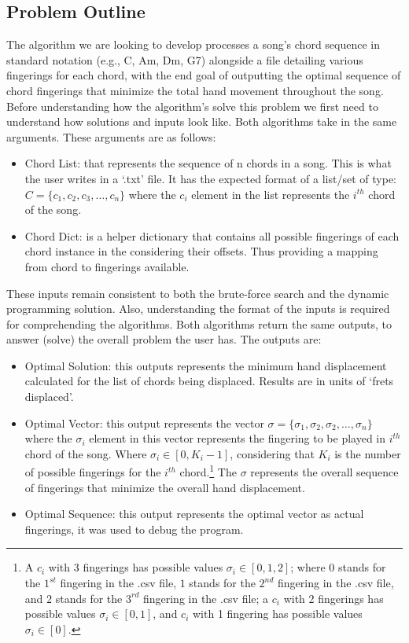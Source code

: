 \documentclass[conference]{IEEEtran}
\begin{document}
\subsection{Problem Outline}
The algorithm we are looking to develop processes a song's chord sequence in standard notation (e.g., C, Am, Dm, G7) alongside a file detailing various fingerings for each chord, with the end goal of outputting the optimal sequence of chord fingerings that minimize the total hand movement throughout the song. Before understanding how the algorithm's solve this problem we first need to understand how solutions and inputs look like.
\newline 
\indent Both algorithms take in the same arguments. These arguments are as follows:
\begin{itemize}
    \item Chord List: that represents the sequence of n chords in a song. This is what the user writes in a `.txt' file. It has the expected format of a list/set of type:
    \( C = \{c_1, c_2, c_3, \dots, c_n\} \) where the \(c_i\) element in the list represents the \(i^{th}\) chord of the song.
    \item Chord Dict: is a helper dictionary that contains all possible fingerings of each chord instance in the considering their offsets. Thus providing a mapping from chord to fingerings available.
\end{itemize}
\indent These inputs remain consistent to both the brute-force search and the dynamic programming solution. Also, understanding the format of the inputs is required for comprehending the algorithms.
\newline
\indent Both algorithms return the same outputs, to answer (solve) the overall problem the user has. The outputs are:
\begin{itemize}
    \item Optimal Solution: this outputs represents the minimum hand displacement calculated for the list of chords being displaced. Results are in units of `frets displaced'.
    \item Optimal Vector: this output represents the vector \(\sigma = \{\sigma_1, \sigma_2, \sigma_2, \ldots, \sigma_n\} \) where the \(\sigma_i\) element in this vector represents the fingering to be played in \(i^{th}\) chord of the song. Where \( \sigma_i \in [0, K_i - 1] \), considering that \( K_i \) is the number of possible fingerings for the \(i^{th}\) chord.\footnote[2]{A \(c_i\) with 3 fingerings has possible values \(\sigma_i \in [0, 1, 2] \); where $0$ stands for the $1^{st}$ fingering in the .csv file, $1$ stands for the $2^{nd}$ fingering in the .csv file, and $2$ stands for the $3^{rd}$ fingering in the .csv file; a \(c_i\) with 2 fingerings has possible values \(\sigma_i \in [0, 1] \), and \(c_i\) with 1 fingering has possible values \(\sigma_i \in [0] \).}
    The \(\sigma\) represents the overall sequence of fingerings that minimize the overall hand displacement. 
    \item Optimal Sequence: this output represents the optimal vector as actual fingerings, it was used to debug the program. 
\end{itemize}
\end{document}
